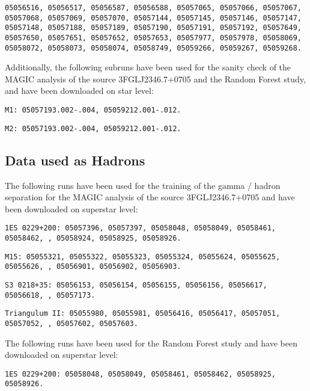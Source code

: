 \texttt{05056516, 05056517, 05056587, 05056588, 05057065, 05057066, 05057067, 05057068, 05057069, 05057070, 05057144, 05057145, 05057146, 05057147, 05057148, 05057188, 05057189, 05057190, 05057191, 05057192, 05057649, 05057650, 05057651, 05057652, 05057653, 05057977, 05057978, 05058069, 05058072, 05058073, 05058074, 05058749, 05059266, 05059267, 05059268.}

\vspace{0.3cm}

Additionally, the following subruns have been used for the sanity check of the MAGIC analysis of the source 3FGLJ2346.7+0705 and the Random Forest study, and have been downloaded on star level:

\texttt{M1: 05057193.002-.004, 05059212.001-.012.}

\texttt{M2: 05057193.002-.004, 05059212.001-.012.}


\newpage


\subsection*{Data used as Hadrons}

The following runs have been used for the training of the gamma / hadron separation for the MAGIC analysis of the source 3FGLJ2346.7+0705 and have been downloaded on superstar level:

\texttt{1ES 0229+200: 05057396, 05057397, 05058048, 05058049, 05058461, 05058462, , 05058924, 05058925, 05058926.}

\texttt{M15: 05055321, 05055322, 05055323, 05055324, 05055624, 05055625, 05055626, , 05056901, 05056902, 05056903. }

\texttt{S3 0218+35: 05056153, 05056154, 05056155, 05056156, 05056617, 05056618, , 05057173.}

\texttt{Triangulum II: 05055980, 05055981, 05056416, 05056417, 05057051, 05057052, , 05057602, 05057603.}


\vspace{0.75cm}

The following runs have been used for the Random Forest study and have been downloaded on superstar level:

\texttt{1ES 0229+200: 05058048, 05058049, 05058461, 05058462, 05058925, 05058926.}

